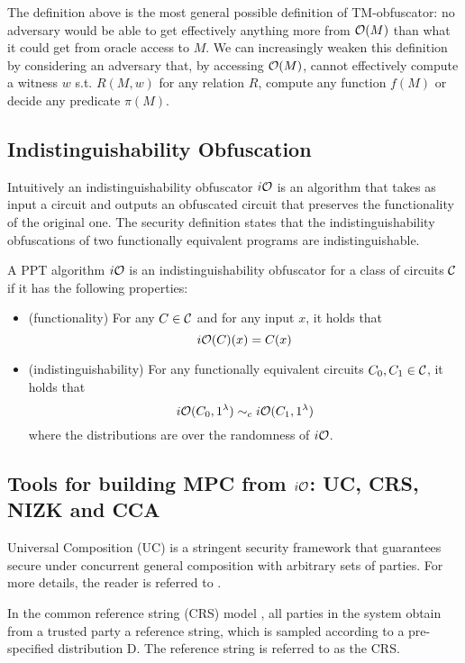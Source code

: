 The definition above is the most general possible definition of TM-obfuscator: no adversary would be able to get effectively anything more from $\mathcal{O}(M)$ than what it could get from oracle access to $M$. We can increasingly weaken this definition by considering an adversary that, by accessing $\mathcal{O}(M)$, cannot effectively compute a witness $w$ s.t. $R(M,w)$ for any relation $R$, compute any function $f(M)$ or decide any predicate $\pi(M)$.



\subsection{Indistinguishability Obfuscation}

Intuitively an indistinguishability obfuscator $i\mathcal{O}$ is an algorithm that takes as input a circuit and outputs an obfuscated circuit that preserves the functionality of the original one. The security definition states that the indistinguishability obfuscations of two functionally equivalent programs are indistinguishable.

\begin{mydef}[IO]
A PPT algorithm $i\mathcal{O}$ is an indistinguishability obfuscator for a class of circuits $\mathcal{C}$ if it has the following properties:
\begin{itemize}
\item (functionality) For any $C\in\mathcal{C}$ and for any input $x$, it holds that
\[
i\mathcal{O}(C)(x)=C(x)
\]
\item (indistinguishability) For any functionally equivalent circuits $C_0,C_1\in\mathcal{C}$, it holds that
\[
i\mathcal{O}(C_0,1^\lambda)\sim_c i\mathcal{O}(C_1,1^\lambda)
\]
where the distributions are over the randomness of $i\mathcal{O}$.
\end{itemize}
\end{mydef}

\subsection{Tools for building MPC from $i\mathcal{O}$: UC, CRS, NIZK and CCA}

Universal Composition (UC) \cite{canetti2001universally} is a stringent security framework that guarantees secure under concurrent general composition with arbitrary sets of parties. For more details, the reader is referred to \cite{canetti2001universally}.

In the common reference string (CRS) model \cite{canetti2001comm,canetti2002}, all parties in the system obtain from a trusted party a reference string, which is sampled according to a pre-specified distribution D. The reference string is referred to as the CRS.


